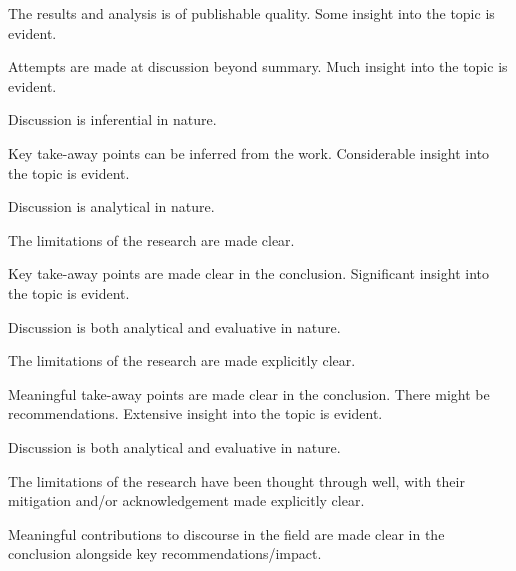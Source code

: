 \begin{markingrubric}
        \par		The results and analysis is of publishable quality.
%
        \grade\fail 
        \grade		Some insight into the topic is evident.
        \par		Attempts are made at discussion beyond summary.
        \grade		Much insight into the topic is evident.
        \par		Discussion is inferential in nature.
        \par		Key take-away points can be inferred from the work.
        \grade		Considerable insight into the topic is evident.
        \par		Discussion is analytical in nature.
        \par		The limitations of the research are made clear.
        \par		Key take-away points are made clear in the conclusion.
        \grade		Significant  insight into the topic is evident.
        \par		Discussion is both analytical and evaluative in nature.
        \par		The limitations of the research are made explicitly clear.
        \par		Meaningful take-away points are made clear in the conclusion. There might be recommendations.
        \grade		Extensive insight into the topic is evident.
        \par		Discussion is both analytical and evaluative in nature.
        \par		The limitations of the research have been thought through well, with their mitigation and/or acknowledgement made explicitly clear.
        \par		Meaningful contributions to discourse in the field are made clear in the conclusion alongside key recommendations/impact.       
%
\end{markingrubric}

